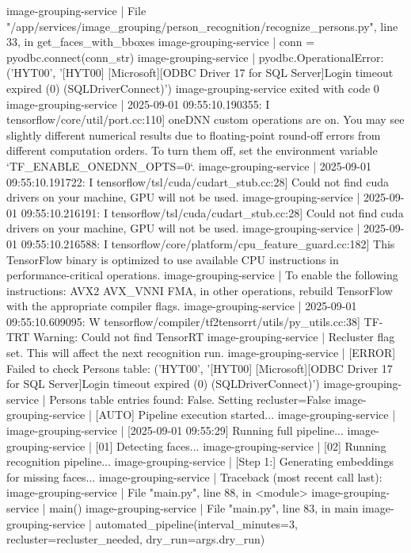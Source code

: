 image-grouping-service  |   File "/app/services/image_grouping/person_recognition/recognize_persons.py", line 33, in get_faces_with_bboxes
image-grouping-service  |     conn = pyodbc.connect(conn_str)
image-grouping-service  | pyodbc.OperationalError: ('HYT00', '[HYT00] [Microsoft][ODBC Driver 17 for SQL Server]Login timeout expired (0) (SQLDriverConnect)')
image-grouping-service exited with code 0
image-grouping-service  | 2025-09-01 09:55:10.190355: I tensorflow/core/util/port.cc:110] oneDNN custom operations are on. You may see slightly different numerical results due to floating-point round-off errors from different computation orders. To turn them off, set the environment variable `TF_ENABLE_ONEDNN_OPTS=0`.
image-grouping-service  | 2025-09-01 09:55:10.191722: I tensorflow/tsl/cuda/cudart_stub.cc:28] Could not find cuda drivers on your machine, GPU will not be used.
image-grouping-service  | 2025-09-01 09:55:10.216191: I tensorflow/tsl/cuda/cudart_stub.cc:28] Could not find cuda drivers on your machine, GPU will not be used.
image-grouping-service  | 2025-09-01 09:55:10.216588: I tensorflow/core/platform/cpu_feature_guard.cc:182] This TensorFlow binary is optimized to use available CPU instructions in performance-critical operations.
image-grouping-service  | To enable the following instructions: AVX2 AVX_VNNI FMA, in other operations, rebuild TensorFlow with the appropriate compiler flags.
image-grouping-service  | 2025-09-01 09:55:10.609095: W tensorflow/compiler/tf2tensorrt/utils/py_utils.cc:38] TF-TRT Warning: Could not find TensorRT
image-grouping-service  | Recluster flag set. This will affect the next recognition run.
image-grouping-service  | [ERROR] Failed to check Persons table: ('HYT00', '[HYT00] [Microsoft][ODBC Driver 17 for SQL Server]Login timeout expired (0) (SQLDriverConnect)')
image-grouping-service  | Persons table entries found: False. Setting recluster=False
image-grouping-service  | [AUTO] Pipeline execution started...
image-grouping-service  |
image-grouping-service  | [2025-09-01 09:55:29] Running full pipeline...
image-grouping-service  | [01] Detecting faces...
image-grouping-service  | [02] Running recognition pipeline...
image-grouping-service  | [Step 1:] Generating embeddings for missing faces...
image-grouping-service  | Traceback (most recent call last):
image-grouping-service  |   File "main.py", line 88, in <module>
image-grouping-service  |     main()
image-grouping-service  |   File "main.py", line 83, in main
image-grouping-service  |     automated_pipeline(interval_minutes=3, recluster=recluster_needed, dry_run=args.dry_run)
